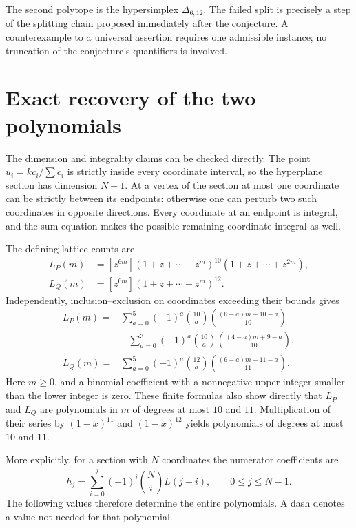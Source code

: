 \documentclass[11pt]{article}
\begin{document}
The second polytope is the hypersimplex $\Delta_{6,12}$. The failed split is precisely a step of the splitting chain proposed immediately after the conjecture. A counterexample to a universal assertion requires one admissible instance; no truncation of the conjecture's quantifiers is involved.

\section{Exact recovery of the two polynomials}
The dimension and integrality claims can be checked directly. The point $u_i=kc_i/\sum c_i$ is strictly inside every coordinate interval, so the hyperplane section has dimension $N-1$. At a vertex of the section at most one coordinate can be strictly between its endpoints: otherwise one can perturb two such coordinates in opposite directions. Every coordinate at an endpoint is integral, and the sum equation makes the possible remaining coordinate integral as well.

The defining lattice counts are
\begin{align}
L_P(m)&=[z^{6m}](1+z+\cdots+z^m)^{10}(1+z+\cdots+z^{2m}),\label{eq:DP}\\
L_Q(m)&=[z^{6m}](1+z+\cdots+z^m)^{12}.\nonumber
\end{align}
Independently, inclusion--exclusion on coordinates exceeding their bounds gives
\begin{align}
L_P(m)={}&\sum_{a=0}^{5}(-1)^a\binom{10}{a}
 \binom{(6-a)m+10-a}{10}\label{eq:IEP}\\
&-\sum_{a=0}^{3}(-1)^a\binom{10}{a}
 \binom{(4-a)m+9-a}{10},\nonumber\\
L_Q(m)={}&\sum_{a=0}^{5}(-1)^a\binom{12}{a}
 \binom{(6-a)m+11-a}{11}.\label{eq:IEQ}
\end{align}
Here $m\ge0$, and a binomial coefficient with a nonnegative upper integer smaller than the lower integer is zero. These finite formulas also show directly that $L_P$ and $L_Q$ are polynomials in $m$ of degrees at most $10$ and $11$. Multiplication of their series by $(1-x)^{11}$ and $(1-x)^{12}$ yields polynomials of degrees at most $10$ and $11$.

More explicitly, for a section with $N$ coordinates the numerator coefficients are
\begin{equation}\label{eq:htransform}
h_j=\sum_{i=0}^{j}(-1)^i\binom Ni L(j-i),\qquad 0\le j\le N-1.
\end{equation}
The following values therefore determine the entire polynomials. A dash denotes a value not needed for that polynomial.
\end{document}

